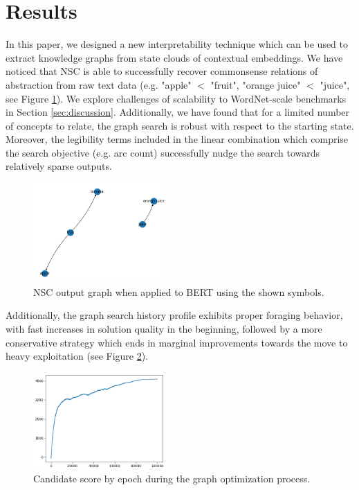 \section{Results}\label{sec:results}

In this paper, we designed a new interpretability technique which can be used to extract knowledge graphs from state clouds of contextual embeddings. We have noticed that NSC is able to successfully recover commonsense relations of abstraction from raw text data (e.g. "apple" $<$ "fruit", "orange juice" $<$ "juice", see Figure \ref{fig:nsc_output_graph}). We explore challenges of scalability to WordNet-scale benchmarks in Section \ref{sec:discussion}. Additionally, we have found that for a limited number of concepts to relate, the graph search is robust with respect to the starting state. Moreover, the legibility terms included in the linear combination which comprise the search objective (e.g. arc count) successfully nudge the search towards relatively sparse outputs.

\begin{figure}[h]
    \centering
    \includegraphics[width=0.45\textwidth]{img/distinct graphs.png}
    \caption{NSC output graph when applied to BERT using the shown symbols.}\label{fig:nsc_output_graph}
\end{figure}

Additionally, the graph search history profile exhibits proper foraging behavior, with fast increases in solution quality in the beginning, followed by a more conservative strategy which ends in marginal improvements towards the move to heavy exploitation (see Figure \ref{fig:nsc_score_history}).

\begin{figure}[h]
    \centering
    \includegraphics[width=0.45\textwidth]{img/score1.png}
    \caption{Candidate score by epoch during the graph optimization process.}\label{fig:nsc_score_history}
\end{figure}

